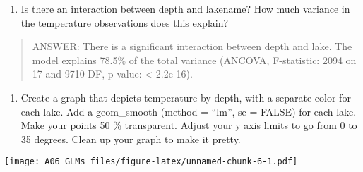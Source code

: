 \documentclass[]{article}
\newenvironment{Shaded}{\begin{snugshade}}{\end{snugshade}}
\newcommand{\KeywordTok}[1]{\textcolor[rgb]{0.13,0.29,0.53}{\textbf{#1}}}
\newcommand{\DataTypeTok}[1]{\textcolor[rgb]{0.13,0.29,0.53}{#1}}
\newcommand{\DecValTok}[1]{\textcolor[rgb]{0.00,0.00,0.81}{#1}}
\newcommand{\FloatTok}[1]{\textcolor[rgb]{0.00,0.00,0.81}{#1}}
\newcommand{\StringTok}[1]{\textcolor[rgb]{0.31,0.60,0.02}{#1}}
\newcommand{\CommentTok}[1]{\textcolor[rgb]{0.56,0.35,0.01}{\textit{#1}}}
\newcommand{\OtherTok}[1]{\textcolor[rgb]{0.56,0.35,0.01}{#1}}
\newcommand{\OperatorTok}[1]{\textcolor[rgb]{0.81,0.36,0.00}{\textbf{#1}}}
\newcommand{\NormalTok}[1]{#1}
\providecommand{\tightlist}{%
  \setlength{\itemsep}{0pt}\setlength{\parskip}{0pt}}
\begin{document}
\begin{enumerate}
\def\labelenumi{\arabic{enumi}.}
\setcounter{enumi}{14}
\tightlist
\item
  Is there an interaction between depth and lakename? How much variance
  in the temperature observations does this explain?
\end{enumerate}

\begin{quote}
ANSWER: There is a significant interaction between depth and lake. The
model explains 78.5\% of the total variance (ANCOVA, F-statistic: 2094
on 17 and 9710 DF, p-value: \textless{} 2.2e-16).
\end{quote}

\begin{enumerate}
\def\labelenumi{\arabic{enumi}.}
\setcounter{enumi}{15}
\tightlist
\item
  Create a graph that depicts temperature by depth, with a separate
  color for each lake. Add a geom\_smooth (method = ``lm'', se = FALSE)
  for each lake. Make your points 50 \% transparent. Adjust your y axis
  limits to go from 0 to 35 degrees. Clean up your graph to make it
  pretty.
\end{enumerate}

\begin{Shaded}
\end{Shaded}

\texttt{[image: A06\_GLMs\_files/figure-latex/unnamed-chunk-6-1.pdf]}
\end{document}
